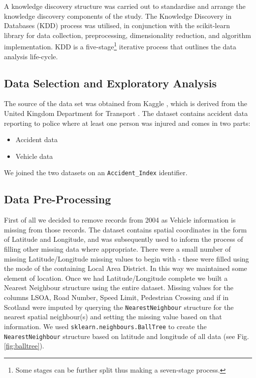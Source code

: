 A knowledge discovery structure was carried out to standardise and arrange the knowledge discovery components of the study.
The Knowledge Discovery in Databases (KDD) process was utilised, in conjunction with the scikit-learn library \cite{scikit-learn} for data collection, preprocessing, dimensionality reduction, and algorithm implementation.
KDD is a five-stage\footnote{Some stages can be further split thus making a seven-stage process.} iterative process that outlines the data analysis life-cycle.


\subsection{Data Selection and Exploratory Analysis}\label{subsec:data-collection}
The source of the data set was obtained from Kaggle \cite{tsiaras2021ukroadsafety}, which is derived from the United Kingdom Department for Transport   \cite{roadtrafficdft}.
The dataset contains accident data reporting to police where at least one person was injured and comes in two parts:
\begin{itemize}
    \item Accident data
    \item Vehicle data
\end{itemize}

We joined the two datasets on an \verb|Accident_Index| identifier.

\subsection{Data Pre-Processing}\label{subsec:data-pre-processing}

First of all we decided to remove records from 2004 as Vehicle information is missing from those records.
The dataset contains spatial coordinates in the form of Latitude and Longitude, and was subsequently used to inform the process of filling other missing data where appropriate.
There were a small number of missing Latitude/Longitude missing values to begin with - these were filled using the mode of the containing Local Area District.
In this way we maintained some element of location.
Once we had Latitude/Longitude complete we built a Nearest Neighbour structure using the entire dataset.
Missing values for the columns LSOA, Road Number, Speed Limit, Pedestrian Crossing and if in Scotland were imputed by querying the \verb|NearestNeighbour| structure for the nearest spatial neighbour(s) and setting the missing value based on that information.
We used \verb|sklearn.neighbours.BallTree| \cite{scikit-learn} to create the \verb|NearestNeighbour| structure based on latitude and longitude of all data (see Fig. \ref{fig:balltree}).


